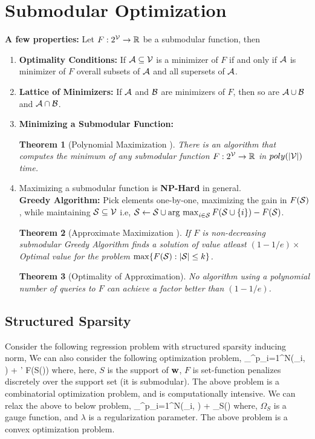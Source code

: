 \documentclass[11pt]{article}
\newtheorem{theorem}{Theorem}{\bf}{\it}
\begin{document}
\section{Submodular Optimization}
\textbf{A few properties:} Let $F: 2^{\V} \to \R$ be a submodular function, then
\begin{enumerate}
\item \textbf{Optimality Conditions:} If $\A \subseteq \V$ is a minimizer of $F$ if and only if $\A$ is minimizer of $F$ overall
subsets of $\A$ and all supersets of $\A$.
\item \textbf{Lattice of Minimizers:} If $\A$ and $\B$ are minimizers of $F$, then so are $\A \cup \B$ and $\A \cap \B$.
\item \textbf{Minimizing a Submodular Function:} 
\begin{theorem}[Polynomial Maximization \cite{grotschel_ellipsoid_1981}]
  There is an algorithm that computes the minimum of any submodular
  function $F: 2^{\V} \to \R$ in $poly(|\V|)$ time.
\end{theorem}
\item Maximizing a submodular function is \textbf{NP-Hard} in general.\\
\textbf{Greedy Algorithm:} Pick elements one-by-one, maximizing the gain
in $F(\S)$, while maintaining $\S \subseteq \V$ i.e, $\S \gets \S \cup \argmax_{i \in \S}F(\S \cup \{i\}) - F(\S)$.
\begin{theorem}[Approximate Maximization \cite{nemhauser_analysis_1978}]
If $F$ is non-decreasing submodular Greedy Algorithm finds a solution
of value atleast $(1-1/e) \times$ Optimal value for the problem $\max\{F(\S): |\S| \leq k\}$.
\end{theorem}
\begin{theorem}[Optimality of Approximation\cite{Nemhauser-Wolsey-78}]
No algorithm using a polynomial number of
queries to $F$ can achieve a factor better than $(1-1/e)$.
\end{theorem}

\end{enumerate}

\subsection{Structured Sparsity}
Consider the following regression problem with structured sparsity inducing norm,
We can also consider the following optimization problem,
\bd
\min_{\w \in \R^{p}}\sum_{i=1}^{N}(\y_i, ) + \lambda' F(S(\w))
\ed
where, here, $S$ is the support of $\w$, $F$ is set-function penalizes discretely over the support set 
(it is submodular). The above problem
is a combinatorial optimization problem, and is computationally intensive. We can relax the above to below problem,
\bd
\min_{\w \in \R^p}\sum_{i=1}^{N}(\y_i, ) + \lambda \Omega_{S}(\w)
\ed
where, $\Omega_{S}$ is a gauge function, and $\lambda$ is a regularization parameter. The above problem is a convex optimization problem.
\end{document}
